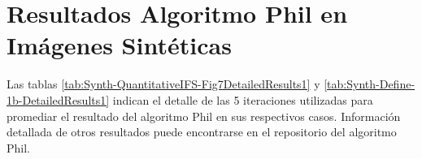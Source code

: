 


\section{Resultados Algoritmo Phil en Im\'agenes Sint\'eticas}

Las tablas \ref{tab:Synth-QuantitativeIFS-Fig7DetailedResults1} y \ref{tab:Synth-Define-1b-DetailedResults1} indican el detalle de las 5 iteraciones utilizadas para promediar el resultado del algoritmo Phil en sus respectivos casos. Informaci\'on detallada de otros resultados puede encontrarse en el repositorio del algoritmo Phil.

